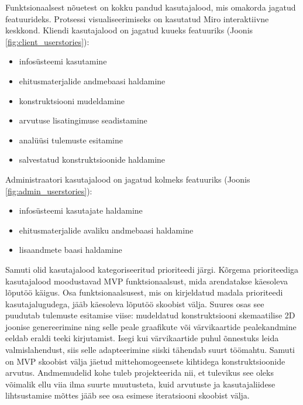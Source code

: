 Funktsionaalsest nõuetest on kokku pandud kasutajalood, mis omakorda jagatud featuurideks. Protsessi visualiseerimiseks on kasutatud Miro interaktiivne
keskkond. Kliendi kasutajalood on jagatud kuueks featuuriks (Joonis \ref{fig:client_userstories}):
\begin{itemize}
    \item infosüsteemi kasutamine
    \item ehitusmaterjalide andmebaasi haldamine
    \item konstruktsiooni mudeldamine
    \item arvutuse lisatingimuse seadistamine
    \item analüüsi tulemuste esitamine
    \item salvestatud konstruktsioonide haldamine
\end{itemize}

Administraatori kasutajalood on jagatud kolmeks featuuriks (Joonis \ref{fig:admin_userstories}):
\begin{itemize}
    \item infosüsteemi kasutajate haldamine
    \item ehitusmaterjalide avaliku andmebaasi haldamine
    \item lisaandmete baasi haldamine
\end{itemize}

Samuti olid kasutajalood kategoriseeritud prioriteedi järgi. Kõrgema prioriteediga kasutajalood moodustavad MVP funktsionaalsust, mida arendatakse käesoleva lõputöö käigus.
Osa funktsionaalsusest, mis on kirjeldatud madala prioriteedi kasutajalugudega, jääb käesoleva lõputöö skoobist välja. Suures osas see puudutab tulemuste esitamise
viise: mudeldatud konstruktsiooni skemaatilise 2D joonise genereerimine ning selle peale graafikute või värvikaartide pealekandmine eeldab 
eraldi teeki kirjutamist. Isegi kui värvikaartide puhul õnnestuks leida valmislahendust, siis selle adapteerimine siiski tähendab suurt töömahtu.
Samuti on MVP skoobist välja jäetud mittehomogeensete kihtidega konstruktsioonide arvutus. Andmemudelid kohe tuleb projekteerida nii, et tulevikus
see oleks võimalik ellu viia ilma suurte muutusteta, kuid arvutuste ja kasutajaliidese lihtsustamise mõttes jääb see osa esimese iteratsiooni skoobist välja.


